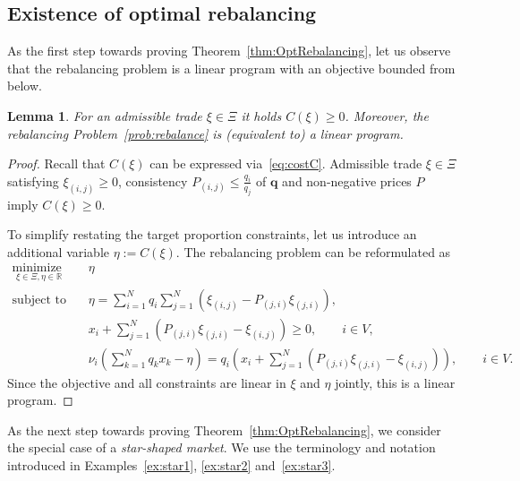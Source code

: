 \documentclass{article}
\newtheorem{lemma}[theorem]{Lemma}
\theoremstyle{definition}
\def\bq{\mathbf{q}}
\def\R{\mathbb{R}}
\begin{document}
\subsection{Existence of optimal rebalancing} \label{append:existenceRebalancing}
As the first step towards proving Theorem~\ref{thm:OptRebalancing}, let us observe that the rebalancing problem is a linear program with an objective bounded from below.
\begin{lemma} \label{lemma:RebalancingProb}
For an admissible trade $\xi \in \Xi$ it holds $C(\xi) \geq 0$.
Moreover, the rebalancing Problem~\ref{prob:rebalance} is (equivalent to) a linear program. 
\end{lemma}
\begin{proof}
Recall that $C(\xi)$ can be expressed via~\eqref{eq:costC}.  
Admissible trade $\xi \in \Xi$ satisfying $\xi_{(i,j)} \geq 0$, consistency $P_{(i,j)} \leq \frac{q_i}{q_j}$ of $\bq$ and non-negative prices $P$ imply $C(\xi) \geq 0$.

To simplify restating the target proportion constraints, let us introduce an additional variable $\eta := C(\xi)$. The rebalancing problem can be reformulated as
\begin{align*}
\underset{\xi \in \Xi, \eta \in \R}{\text{minimize }} \quad  & \eta \\
\text{subject to } \quad &\eta = \sum\limits_{i=1}^N q_i \sum\limits_{j=1}^N  (\xi_{(i, j)} - P_{(j,i)} \xi_{(j,i)}), \\
&x_i + \sum\limits_{j=1}^N  (P_{(j,i)} \xi_{(j,i)} - \xi_{(i, j)}) \geq 0, \quad \quad i \in V, \label{prob:eq2} \\
&\nu_i \left( \sum\limits_{k=1}^N q_k  x_k - \eta \right) = q_i \left( x_i + \sum\limits_{j=1}^N  (P_{(j,i)} \xi_{(j,i)} - \xi_{(i, j)}) \right), \quad \quad i \in V.
\end{align*}
Since the objective and all constraints are linear in $\xi$ and $\eta$ jointly, this is a linear program.
\end{proof}



As the next step towards proving Theorem~\ref{thm:OptRebalancing}, we consider the special case of a \emph{star-shaped market}. We use the terminology and notation introduced in Examples~\ref{ex:star1}, \ref{ex:star2} and~\ref{ex:star3}.
\end{document}
